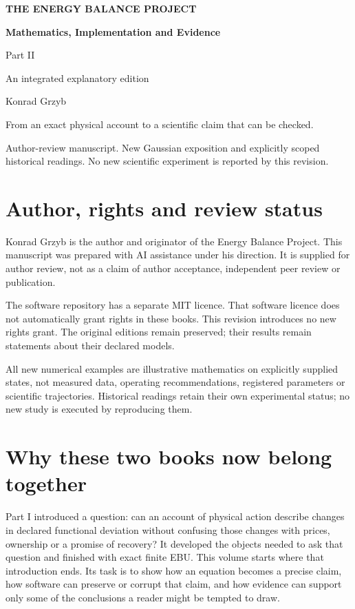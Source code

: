 \begin{titlepage}
\raggedright
{\color{teal}\sffamily\bfseries THE ENERGY BALANCE PROJECT\par}
\vspace{30pt}
{\color{navy}\sffamily\bfseries\fontsize{26}{31}\selectfont Mathematics, Implementation and Evidence\par}
\vspace{20pt}
{\Large Part II\par}
\vspace{12pt}
{\large An integrated explanatory edition\par}
\vspace{20pt}
{\large Konrad Grzyb\par}
\vfill
{\color{slate}From an exact physical account to a scientific claim that can be checked.\par}
\vspace{16pt}
Author-review manuscript. New Gaussian exposition and explicitly scoped
historical readings. No new scientific experiment is reported by this revision.
\end{titlepage}

\chapter*{Author, rights and review status}
Konrad Grzyb is the author and originator of the Energy Balance Project.
This manuscript was prepared with AI assistance under his direction.
It is supplied for author review, not as a claim of author acceptance,
independent peer review or publication.

The software repository has a separate MIT licence. That software licence
does not automatically grant rights in these books. This revision introduces
no new rights grant. The original editions remain preserved; their results
remain statements about their declared models.

All new numerical examples are illustrative mathematics on explicitly
supplied states, not measured data, operating recommendations, registered
parameters or scientific trajectories. Historical readings retain their
own experimental status; no new study is executed by reproducing them.

\chapter*{Why these two books now belong together}
Part I introduced a question: can an account of physical action describe
changes in declared functional deviation without confusing those changes
with prices, ownership or a promise of recovery? It developed the objects
needed to ask that question and finished with exact finite EBU. This volume
starts where that introduction ends. Its task is to show how an equation
becomes a precise claim, how software can preserve or corrupt that claim,
and how evidence can support only some of the conclusions a reader might
be tempted to draw.

